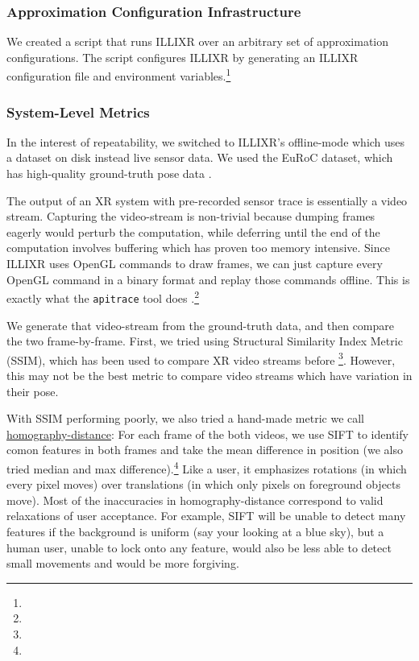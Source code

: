 \subsubsection{Approximation Configuration Infrastructure}

We created a script that runs ILLIXR over an arbitrary set of approximation configurations.
The script configures ILLIXR by generating an ILLIXR configuration file and environment variables.\footnote{}

\subsubsection{System-Level Metrics}

In the interest of repeatability, we switched to ILLIXR's offline-mode which uses a dataset on disk instead live sensor data.
We used the EuRoC dataset, which has high-quality ground-truth pose data \cite{Burri25012016}.

The output of an XR system with pre-recorded sensor trace is essentially a video stream.
Capturing the video-stream is non-trivial because dumping frames eagerly would perturb the computation, while deferring until the end of the computation involves buffering which has proven too memory intensive.
Since ILLIXR uses OpenGL commands to draw frames, we can just capture every OpenGL command in a binary format and replay those commands offline.
This is exactly what the \verb+apitrace+ tool does \cite{apitrace}.\footnote{}

We generate that video-stream from the ground-truth data, and then compare the two frame-by-frame.
First, we tried using Structural Similarity Index Metric (SSIM), which has been used to compare XR video streams before \footnote{}.
However, this may not be the best metric to compare video streams which have variation in their pose.

With SSIM performing poorly, we also tried a hand-made metric we call \ul{homography-distance}:
For each frame of the both videos, we use SIFT to identify comon features in both frames  and take the mean difference in position (we also tried median and max difference).\footnote{}
Like a user, it emphasizes rotations (in which every pixel moves) over translations (in which only pixels on foreground objects move).
Most of the inaccuracies in homography-distance correspond to valid relaxations of user acceptance.
For example, SIFT will be unable to detect many features if the background is uniform (say your looking at a blue sky),
    but a human user, unable to lock onto any feature, would also be less able to detect small movements and would be more forgiving.

